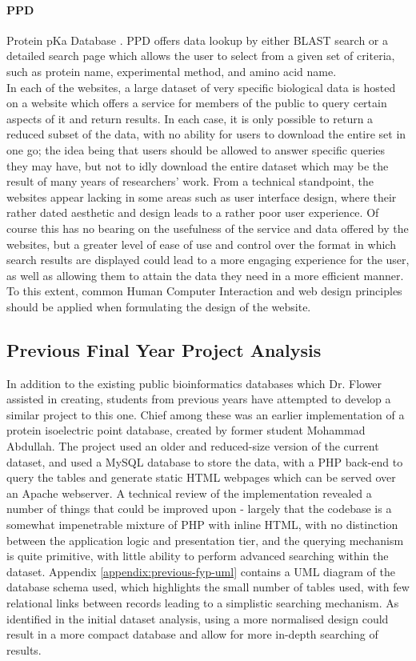 \paragraph{PPD} Protein pKa Database \cite{DDGNDa}. PPD offers data lookup by
either BLAST search or a detailed search page which allows the user to select
from a given set of criteria, such as protein name, experimental method, and
amino acid name.\\

In each of the websites, a large dataset of very specific biological data is
hosted on a website which offers a service for members of the public to query
certain aspects of it and return results. In each case, it is only possible to
return a reduced subset of the data, with no ability for users to download the
entire set in one go; the idea being that users should be allowed to answer
specific queries they may have, but not to idly download the entire dataset
which may be the result of many years of researchers' work. From a technical
standpoint, the websites appear lacking in some areas such as user interface
design, where their rather dated aesthetic and design leads to a rather poor
user experience. Of course this has no bearing on the usefulness of the service
and data offered by the websites, but a greater level of ease of use and control
over the format in which search results are displayed could lead to a more
engaging experience for the user, as well as allowing them to attain the data
they need in a more efficient manner. To this extent, common Human Computer
Interaction and web design principles should be applied when formulating the
design of the website.

\subsection{Previous Final Year Project Analysis}

In addition to the existing public bioinformatics databases which Dr. Flower
assisted in creating, students from previous years have attempted to develop a
similar project to this one. Chief among these was an earlier implementation of
a protein isoelectric point database, created by former student Mohammad
Abdullah. The project used an older and reduced-size version of the current
dataset, and used a MySQL database to store the data, with a PHP back-end to
query the tables and generate static HTML webpages which can be served over an
Apache webserver. A technical review of the implementation revealed a number of
things that could be improved upon - largely that the codebase is a somewhat
impenetrable mixture of PHP with inline HTML, with no distinction between the
application logic and presentation tier, and the querying mechanism is quite
primitive, with little ability to perform advanced searching within the
dataset. Appendix \ref{appendix:previous-fyp-uml} contains a UML diagram of the
database schema used, which highlights the small number of tables used, with few
relational links between records leading to a simplistic searching mechanism. As
identified in the initial dataset analysis, using a more normalised design could
result in a more compact database and allow for more in-depth searching of
results.
